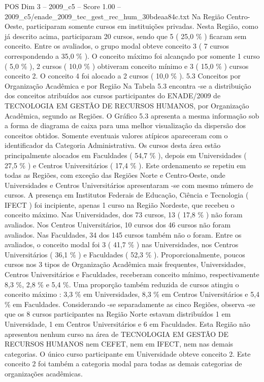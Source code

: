 \begin{textsample}{POS Dim 3 – 2009\_c5 – Score 1.00 – 2009\_c5/enade\_2009\_tec\_gest\_rec\_hum\_30bdeaa84c.txt}
Na Região Centro-Oeste, participaram somente cursos em instituições privadas.
Nesta Região, como já descrito acima, participaram 20 cursos, sendo que 5 ( 25,0 \% ) ficaram sem conceito.
Entre os avaliados, o grupo modal obteve conceito 3 ( 7 cursos correspondendo a 35,0 \% ).
O conceito máximo foi alcançado por somente 1 curso ( 5,0 \% ), 2 cursos ( 10,0 \% ) obtiveram conceito mínimo e 3 ( 15,0 \% ) cursos conceito 2.
O conceito 4 foi alocado a 2 cursos ( 10,0 \% ). 5.3 Conceitos por Organização Acadêmica e por Região Na Tabela 5.3 encontra -se a distribuição dos conceitos atribuídos aos cursos participantes do ENADE/2009 de TECNOLOGIA EM GESTÃO DE RECURSOS HUMANOS, por Organização Acadêmica, segundo as Regiões.
O Gráfico 5.3 apresenta a mesma informação sob a forma de diagrama de caixa para uma melhor visualização da dispersão dos conceitos obtidos.
Somente eventuais valores atípicos apareceram com o identificador da Categoria Administrativa.
Os cursos desta área estão principalmente alocados em Faculdades ( 54,7 \% ), depois em Universidades ( 27,5 \% ) e Centros Universitários ( 17,4 \% ).
Este ordenamento se repetiu em todas as Regiões, com exceção das Regiões Norte e Centro-Oeste, onde Universidades e Centros Universitários apresentaram -se com mesmo número de cursos.
A presença em Institutos Federais de Educação, Ciência e Tecnologia ( IFECT ) foi incipiente, apenas 1 curso na Região Nordeste, que recebeu o conceito máximo.
Nas Universidades, dos 73 cursos, 13 ( 17,8 \% ) não foram avaliados.
Nos Centros Universitários, 10 cursos dos 46 cursos não foram avaliados.
Nas Faculdades, 34 dos 145 cursos também não o foram.
Entre os avaliados, o conceito modal foi 3 ( 41,7 \% ) nas Universidades, nos Centros Universitários ( 36,1 \% ) e Faculdades ( 52,3 \% ).
Proporcionalmente, poucos cursos nos 3 tipos de Organização Acadêmica mais frequentes, Universidades, Centros Universitários e Faculdades, receberam conceito mínimo, respectivamente 8,3 \%, 2,8 \% e 5,4 \%.
Uma proporção também reduzida de cursos atingiu o conceito máximo : 3,3 \% em Universidades, 8,3 \% em Centros Universitários e 5,4 \% em Faculdades.
Considerando -se separadamente as cinco Regiões, observa -se que os 8 cursos participantes na Região Norte estavam distribuídos 1 em Universidade, 1 em Centros Universitários e 6 em Faculdades.
Esta Região não apresentou nenhum curso na área de TECNOLOGIA EM GESTÃO DE RECURSOS HUMANOS nem CEFET, nem em IFECT, nem nas demais categorias.
O único curso participante em Universidade obteve conceito 2.
Este conceito 2 foi também a categoria modal para todas as demais categorias de organizações acadêmicas.

\end{textsample}
